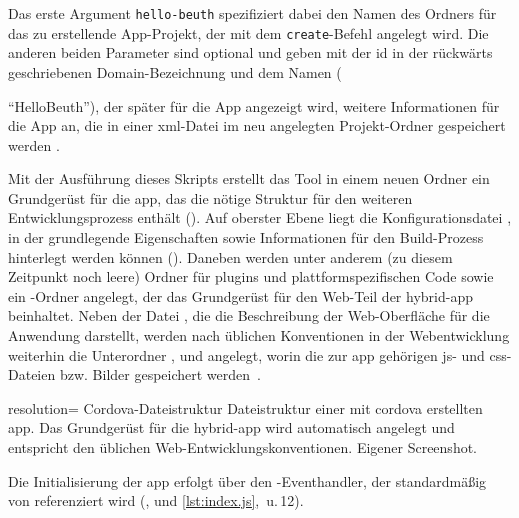 Das erste Argument \lstinline|hello-beuth| spezifiziert dabei den Namen des Ordners für das zu erstellende App-Projekt, der mit dem \lstinline|create|-Befehl angelegt wird.
Die anderen beiden Parameter sind optional und geben mit der \gls{id} in der rückwärts geschriebenen Domain-Bezeichnung und dem Namen ({\mbox{\enquote{HelloBeuth}}), der später für die App angezeigt wird, weitere Informationen für die App an, die in einer \gls{xml}-Datei im neu angelegten Projekt-Ordner gespeichert werden \cite{Cordova-Docs_CLI}.

Mit der Ausführung dieses Skripts erstellt das Tool in einem neuen Ordner ein Grundgerüst für die \gls{app}, das die nötige Struktur für den weiteren Entwicklungsprozess enthält ().
Auf oberster Ebene liegt die Konfigurationsdatei , in der grundlegende Eigenschaften sowie Informationen für den Build-Prozess hinterlegt werden können ().
Daneben werden unter anderem (zu diesem Zeitpunkt noch leere) Ordner für \glspl{plugin} und plattformspezifischen Code sowie ein -Ordner angelegt, der das Grundgerüst für den Web-Teil der \gls{hybrid-app} beinhaltet.
Neben der Datei , die die Beschreibung der Web-Oberfläche für die Anwendung darstellt, werden nach üblichen Konventionen in der Webentwicklung weiterhin die Unterordner ,  und  angelegt, worin die zur \gls{app} gehörigen \gls{js}- und \gls{css}-Dateien bzw. Bilder gespeichert werden~\cite{Cordova-Docs_CLI}.


	{resolution=\screenshotRes}
	{Cordova-Dateistruktur}
		{Dateistruktur einer mit \gls{cordova} erstellten \gls{app}. Das Grundgerüst für die \gls{hybrid-app} wird automatisch angelegt und entspricht den üblichen Web-Entwicklungskonventionen.}
	{Eigener Screenshot.}


	

Die Initialisierung der \gls{app} erfolgt über den -Eventhandler, der standardmäßig von  referenziert wird (,  und \autoref{lst:index.js}, \,u.\,12).

}
